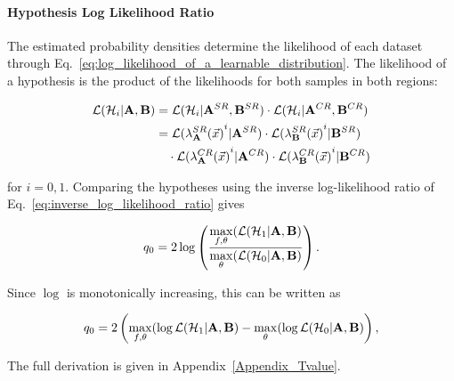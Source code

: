 \documentclass[paper/ddppaper2.tex]{subfiles}
\begin{document}
\paragraph{Hypothesis Log Likelihood Ratio}

The estimated probability densities determine the likelihood of each dataset through Eq.~\ref{eq:log_likelihood_of_a_learnable_distribution}. The likelihood of a hypothesis is the product of the likelihoods for both samples in both regions:

\begin{wideequations}
\begin{equation}
\begin{aligned}
\mathcal{L}({\mathcal{H}_{i}} | {\mathbf{A}}, {\mathbf{B}})
    &= \mathcal{L}({\mathcal{H}_{i}}|{{\mathbf{A}}^{SR}}, {{\mathbf{B}}^{SR}})
       \cdot \mathcal{L}({\mathcal{H}_{i}}|{{\mathbf{A}}^{CR}}, {{\mathbf{B}}^{CR}}) \\
    &= \mathcal{L}({{\lambda}_{{\mathbf{A}}}^{SR}(\vec{{x}})}^i|{{\mathbf{A}}^{SR}})
       \cdot \mathcal{L}({{\lambda}_{{\mathbf{B}}}^{SR}(\vec{{x}})}^i|{{\mathbf{B}}^{SR}}) \\
    &\quad \cdot \mathcal{L}({{\lambda}_{{\mathbf{A}}}^{CR}(\vec{{x}})}^i|{{\mathbf{A}}^{CR}})
       \cdot \mathcal{L}({{\lambda}_{{\mathbf{B}}}^{CR}(\vec{{x}})}^i|{{\mathbf{B}}^{CR}})
\end{aligned}
\end{equation}

\noindent for $i=0,1$. Comparing the hypotheses using the inverse log-likelihood ratio of Eq.~\ref{eq:inverse_log_likelihood_ratio} gives

\begin{equation*}
{q_{0}} = 2 \log \left(
    \frac{
        \max\limits_{f, {\theta}} (\mathcal{L}({\mathcal{H}_{1}}|{\mathbf{A}}, {\mathbf{B}})
    }{
        \max\limits_{{\theta}} (\mathcal{L}({{\mathcal{H}_{0}}}|{\mathbf{A}}, {\mathbf{B}})
}\right).
\end{equation*}

\noindent Since $\log$ is monotonically increasing, this can be written as

\begin{equation}
\label{eq:high_level_overall_test_statistic}
    \invllratio = 2 \left( {\max\limits_{f, \nparam}(\log \likelihood(\hypothesis{1}|\dataset{A}, \dataset{B})} - {\max\limits_{\nparam}(\log \likelihood(\nullhypothesis|\dataset{A}, \dataset{B})} \right),
\end{equation}
\end{wideequations}

\noindent The full derivation is given in Appendix~\ref{Appendix_Tvalue}.
\end{document}
